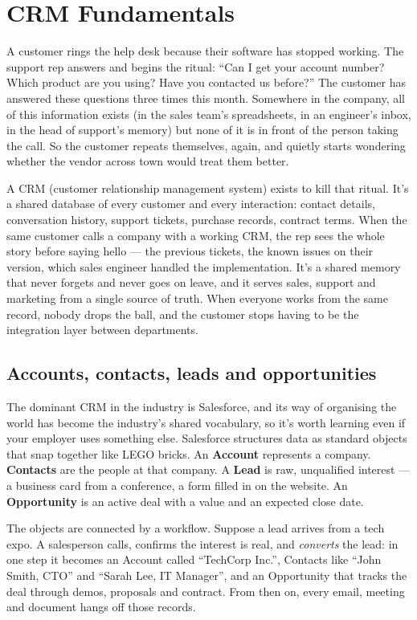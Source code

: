 \section{CRM Fundamentals}
A customer rings the help desk because their software has stopped working. The support rep answers and begins the ritual: ``Can I get your account number? Which product are you using? Have you contacted us before?'' The customer has answered these questions three times this month. Somewhere in the company, all of this information exists (in the sales team's spreadsheets, in an engineer's inbox, in the head of support's memory) but none of it is in front of the person taking the call. So the customer repeats themselves, again, and quietly starts wondering whether the vendor across town would treat them better.


A CRM (customer relationship management system) exists to kill that ritual. It's a shared database of every customer and every interaction: contact details, conversation history, support tickets, purchase records, contract terms. When the same customer calls a company with a working CRM, the rep sees the whole story before saying hello — the previous tickets, the known issues on their version, which sales engineer handled the implementation. It's a shared memory that never forgets and never goes on leave, and it serves sales, support and marketing from a single source of truth. When everyone works from the same record, nobody drops the ball, and the customer stops having to be the integration layer between departments.



\subsection{Accounts, contacts, leads and opportunities}


The dominant CRM in the industry is Salesforce, and its way of organising the world has become the industry's shared vocabulary, so it's worth learning even if your employer uses something else. Salesforce structures data as standard objects that snap together like LEGO bricks. An \textbf{Account} represents a company. \textbf{Contacts} are the people at that company. A \textbf{Lead} is raw, unqualified interest — a business card from a conference, a form filled in on the website. An \textbf{Opportunity} is an active deal with a value and an expected close date.


The objects are connected by a workflow. Suppose a lead arrives from a tech expo. A salesperson calls, confirms the interest is real, and \emph{converts} the lead: in one step it becomes an Account called ``TechCorp Inc.'', Contacts like ``John Smith, CTO'' and ``Sarah Lee, IT Manager'', and an Opportunity that tracks the deal through demos, proposals and contract. From then on, every email, meeting and document hangs off those records.


